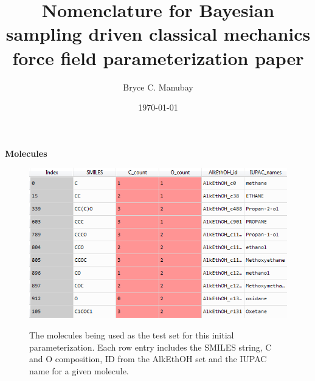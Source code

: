 \documentclass{report}
\title{Nomenclature for Bayesian sampling driven classical mechanics force field parameterization paper}
\author{Bryce C. Manubay}
\date{\today}
\begin{document}
{\let\newpage\relax\maketitle}
\begin{outline}
  \item{\bf Molecules}
   \begin{figure}[h!]
   \centering
  
   \includegraphics[width=.9\linewidth]{bayes1_mols.PNG}
   \label{fig:sub1}
   \caption{The molecules being used as the test set for this initial parameterization. Each row entry includes the SMILES string, C and O composition, ID from
            the AlkEthOH set and the IUPAC name for a given molecule.}
  

\end{figure}
\end{outline}
\end{document}
